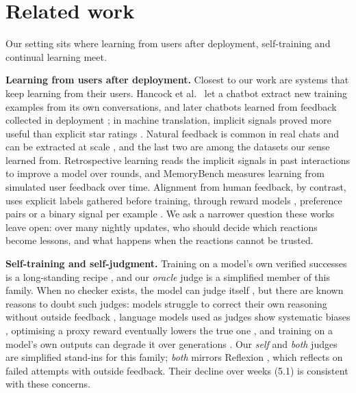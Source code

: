 \section{Related work}

Our setting sits where learning from users after deployment, self-training and continual learning meet.

\textbf{Learning from users after deployment.} Closest to our work are systems that keep learning from their users. Hancock et al.\ \cite{hancock2019learning} let a chatbot extract new training examples from its own conversations, and later chatbots learned from feedback collected in deployment \cite{xu2023learning}; in machine translation, implicit signals proved more useful than explicit star ratings \cite{kreutzer2018can}. Natural feedback is common in real chats and can be extracted at scale \cite{doneyehiya2024naturally, shi2026wildfeedback, peng2026wildreward}, and the last two are among the datasets our sense learned from. Retrospective learning \cite{chen2025retrospective} reads the implicit signals in past interactions to improve a model over rounds, and MemoryBench \cite{ai2026memorybench} measures learning from simulated user feedback over time. Alignment from human feedback, by contrast, uses explicit labels gathered before training, through reward models \cite{christiano2017deep, ouyang2022training}, preference pairs \cite{rafailov2023dpo} or a binary signal per example \cite{ethayarajh2024model}. We ask a narrower question these works leave open: over many nightly updates, who should decide which reactions become lessons, and what happens when the reactions cannot be trusted.

\textbf{Self-training and self-judgment.} Training on a model's own verified successes is a long-standing recipe \cite{zelikman2022star, yuan2023scaling, gulcehre2023reinforced, singh2024beyond}, and our \emph{oracle} judge is a simplified member of this family. When no checker exists, the model can judge itself \cite{yuan2024selfrewarding, wu2025meta}, but there are known reasons to doubt such judges: models struggle to correct their own reasoning without outside feedback \cite{huang2024large}, language models used as judges show systematic biases \cite{zheng2023judging}, optimising a proxy reward eventually lowers the true one \cite{gao2023scaling}, and training on a model's own outputs can degrade it over generations \cite{shumailov2024ai}. Our \emph{self} and \emph{both} judges are simplified stand-ins for this family; \emph{both} mirrors Reflexion \cite{shinn2023reflexion}, which reflects on failed attempts with outside feedback. Their decline over weeks (5.1) is consistent with these concerns.

